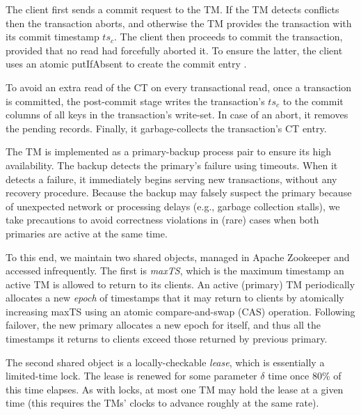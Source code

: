 The client first 
sends a commit request to the TM. 
If the TM detects conflicts then the transaction aborts, and otherwise the TM provides the transaction with its commit  timestamp $ts_c$. 
The client then proceeds to commit the transaction, provided that no read had forcefully aborted  it. To ensure the latter, the client uses 
an atomic putIfAbsent to create the commit entry .

To avoid an extra read of the CT on every transactional read, once a transaction is committed, the post-commit stage writes 
the transaction's $ts_c$ to the commit columns of all keys in  the transaction's write-set. 
In case of an abort, it removes the pending records.
Finally, it garbage-collects the transaction's CT entry. 


 The TM is implemented as a primary-backup process pair to ensure its high availability. 
The backup detects the primary's failure using timeouts. When it detects a failure, it immediately begins serving new
transactions, without any recovery procedure. Because the backup may falsely suspect the primary because of
unexpected network or processing delays (e.g., garbage collection stalls), we take precautions to avoid correctness
violations in (rare) cases when both primaries are active at the same time.

To this end, we maintain two shared objects, managed in Apache Zookeeper and accessed infrequently.
The first is \emph{maxTS}, which is the maximum timestamp an active TM is allowed to return to its clients.
An active (primary) TM periodically allocates a new \emph{epoch} of timestamps that it may return to clients by atomically
increasing maxTS using an atomic compare-and-swap (CAS) operation.  
Following failover, the new primary  allocates a new epoch for itself, and thus all the timestamps it returns to clients
exceed those returned by previous primary. 

The second shared object is a locally-checkable \emph{lease}, which is essentially a  limited-time lock.
The lease is renewed for some parameter $\delta$  time once 80\% of this time elapses.
As with locks, at most one TM may hold the lease at a given time (this requires the TMs' clocks to advance roughly at the same rate). 


